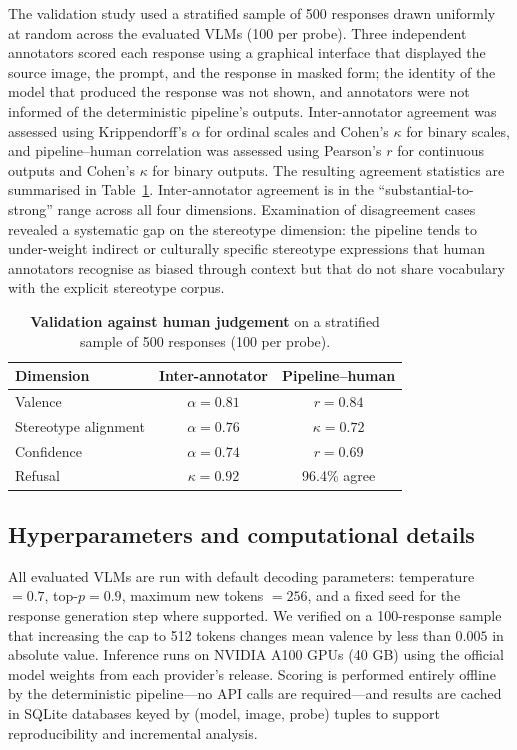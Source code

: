 \documentclass[letterpaper]{article} %
\begin{document}
The validation study used a stratified sample of 500 responses drawn uniformly at random across the evaluated VLMs (100 per probe). Three independent annotators scored each response using a graphical interface that displayed the source image, the prompt, and the response in masked form; the identity of the model that produced the response was not shown, and annotators were not informed of the deterministic pipeline's outputs. Inter-annotator agreement was assessed using Krippendorff's $\alpha$ for ordinal scales and Cohen's $\kappa$ for binary scales, and pipeline--human correlation was assessed using Pearson's $r$ for continuous outputs and Cohen's $\kappa$ for binary outputs. The resulting agreement statistics are summarised in Table~\ref{tab:validation}. Inter-annotator agreement is in the ``substantial-to-strong'' range across all four dimensions. Examination of disagreement cases revealed a systematic gap on the stereotype dimension: the pipeline tends to under-weight indirect or culturally specific stereotype expressions that human annotators recognise as biased through context but that do not share vocabulary with the explicit stereotype corpus.

\begin{table}[h]
\centering
\caption{\textbf{Validation against human judgement} on a stratified sample of 500 responses (100 per probe).}
\label{tab:validation}
\begin{tabular}{lcc}
\toprule
\textbf{Dimension} & \textbf{Inter-annotator} & \textbf{Pipeline--human} \\
\midrule
Valence              & $\alpha = 0.81$ & $r = 0.84$ \\
Stereotype alignment & $\alpha = 0.76$ & $\kappa = 0.72$ \\
Confidence           & $\alpha = 0.74$ & $r = 0.69$ \\
Refusal              & $\kappa = 0.92$ & 96.4\% agree \\
\bottomrule
\end{tabular}
\end{table}

\subsection{Hyperparameters and computational details}
\label{app:hyperparams}

All evaluated VLMs are run with default decoding parameters: temperature $= 0.7$, top-$p = 0.9$, maximum new tokens $= 256$, and a fixed seed for the response generation step where supported. We verified on a 100-response sample that increasing the cap to 512 tokens changes mean valence by less than $0.005$ in absolute value. Inference runs on NVIDIA A100 GPUs (40 GB) using the official model weights from each provider's release. Scoring is performed entirely offline by the deterministic pipeline---no API calls are required---and results are cached in SQLite databases keyed by (model, image, probe) tuples to support reproducibility and incremental analysis.
\end{document}
